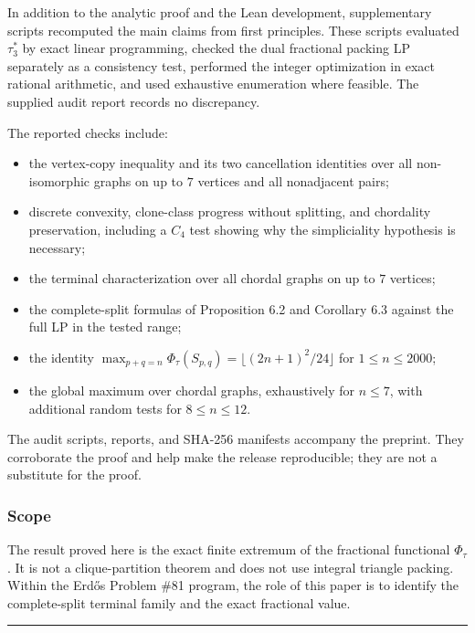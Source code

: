 \documentclass[english,11pt,a4paper]{article}
\providecommand{\tightlist}{\setlength{\itemsep}{0pt}\setlength{\parskip}{0pt}}
\begin{document}
In addition to the analytic proof and the Lean development,
supplementary scripts recomputed the main claims from first principles.
These scripts evaluated \(\tau_3^*\) by exact linear programming,
checked the dual fractional packing LP separately as a consistency test,
performed the integer optimization in exact rational arithmetic, and
used exhaustive enumeration where feasible. The supplied audit report
records no discrepancy.

The reported checks include:

\begin{itemize}
\tightlist
\item
  the vertex-copy inequality and its two cancellation identities over
  all non-isomorphic graphs on up to \(7\) vertices and all nonadjacent
  pairs;
\item
  discrete convexity, clone-class progress without splitting, and
  chordality preservation, including a \(C_4\) test showing why the
  simpliciality hypothesis is necessary;
\item
  the terminal characterization over all chordal graphs on up to \(7\)
  vertices;
\item
  the complete-split formulas of Proposition 6.2 and Corollary 6.3
  against the full LP in the tested range;
\item
  the identity
  \(\max_{p+q=n}\Phi_\tau(S_{p,q})=\lfloor(2n+1)^2/24\rfloor\) for
  \(1\le n\le2000\);
\item
  the global maximum over chordal graphs, exhaustively for \(n\le7\),
  with additional random tests for \(8\le n\le12\).
\end{itemize}

The audit scripts, reports, and SHA-256 manifests accompany the
preprint. They corroborate the proof and help make the release
reproducible; they are not a substitute for the proof.

\subsubsection{Scope}\label{scope}

The result proved here is the exact finite extremum of the fractional
functional \(\Phi_\tau\). It is not a clique-partition theorem and does
not use integral triangle packing. Within the Erdős Problem \#81
program, the role of this paper is to identify the complete-split
terminal family and the exact fractional value.

\begin{center}\rule{0.5\linewidth}{0.5pt}\end{center}
\end{document}
